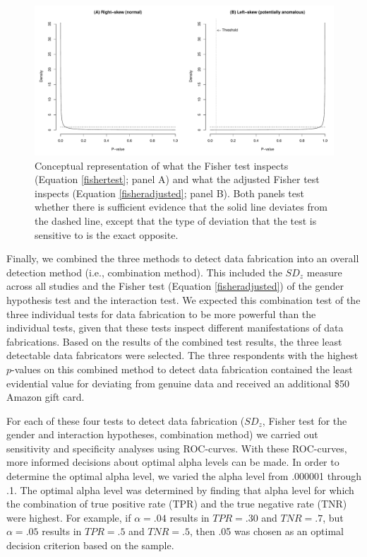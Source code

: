 \documentclass{article}
\begin{document}
\begin{figure}[!ht]
\begin{center}
\includegraphics[width=\textwidth,height=\textheight,keepaspectratio]{../figures/fisherfig.pdf}
\caption{Conceptual representation of what the Fisher test inspects (Equation \ref{fishertest}; panel A) and what the adjusted Fisher test inspects (Equation \ref{fisheradjusted}; panel B). Both panels test whether there is sufficient evidence that the solid line deviates from the dashed line, except that the type of deviation that the test is sensitive to is the exact opposite.}
\label{leftskew}
\end{center}
\end{figure}

Finally, we combined the three methods to detect data fabrication into an overall detection method (i.e., combination method). This included the $SD_z$ measure across all studies and the Fisher test (Equation \ref{fisheradjusted}) of the gender hypothesis test and the interaction test.  We expected this combination test of the three individual tests for data fabrication to be more powerful than the individual tests, given that these tests inspect different manifestations of data fabrications. Based on the results of the combined test results, the three least detectable data fabricators were selected. The three respondents with the highest $p$-values on this combined method to detect data fabrication contained the least evidential value for deviating from genuine data and received an additional \$50 Amazon gift card.

For each of these four tests to detect data fabrication ($SD_z$, Fisher test for the gender and interaction hypotheses, combination method) we carried out sensitivity and specificity analyses using ROC-curves. With these ROC-curves, more informed decisions about optimal alpha levels can be made. In order to determine the optimal alpha level, we varied the alpha level from .000001 through .1. The optimal alpha level was determined by finding that alpha level for which the combination of true positive rate (TPR) and the true negative rate (TNR) were highest. For example, if $\alpha=.04$ results in $TPR=.30$ and $TNR=.7$, but $\alpha=.05$ results in $TPR=.5$ and $TNR=.5$, then .05 was chosen as an optimal decision criterion based on the sample.
\end{document}
